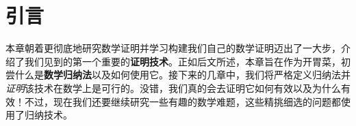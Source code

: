 \section{引言}

本章朝着更彻底地研究数学证明并学习构建我们自己的数学证明迈出了一大步，介绍了我们见到的第一个重要的\textbf{证明技术}。正如后文所述，本章旨在作为开胃菜，初尝什么是\textbf{数学归纳法}以及如何使用它。接下来的几章中，我们将严格定义归纳法并\emph{证明}该技术在数学上是可行的。没错，我们真的会去证明它如何有效以及为什么有效！不过，现在我们还要继续研究一些有趣的数学难题，这些精挑细选的问题都使用了归纳技术。








